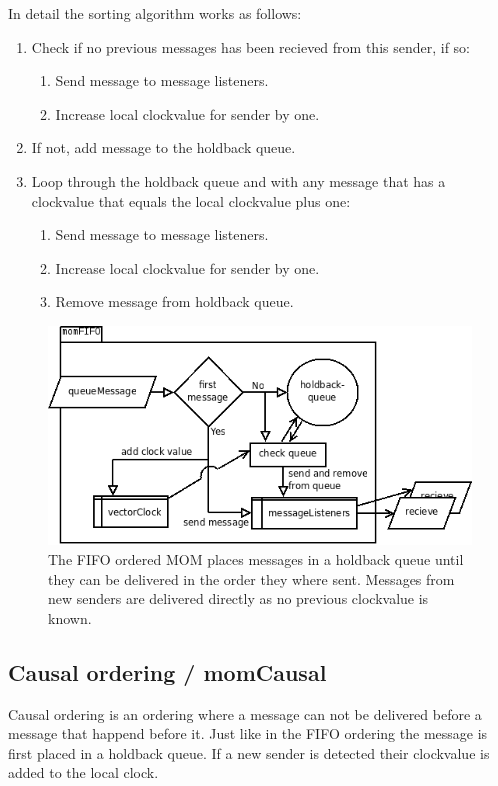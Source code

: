 \documentclass[english]{article}
\begin{document}
In detail the sorting algorithm works as follows:
\begin{enumerate}
\item Check if no previous messages has been recieved from this sender, if so:
	\begin{enumerate}
	\item Send message to message listeners.
	\item Increase local clockvalue for sender by one.
	\end{enumerate}
\item If not, add message to the holdback queue.
\item Loop through the holdback queue and with any message that has a clockvalue that equals the local clockvalue plus one:
	\begin{enumerate}
	\item Send message to message listeners.
	\item Increase local clockvalue for sender by one.
	\item Remove message from holdback queue.
	\end{enumerate}
\end{enumerate}

\begin{figure}
\includegraphics[width=\textwidth]{momFIFO.png}
\caption{The FIFO ordered MOM places messages in a holdback queue until they can be delivered in the order they where sent. Messages from new senders are delivered directly as no previous clockvalue is known.}
\label{fig:fifo}
\end{figure}

\subsection{Causal ordering / momCausal}
Causal ordering is an ordering where a message can not be delivered before a message that happend before it. Just like in the FIFO ordering the message is first placed in a holdback queue. If a new sender is detected their clockvalue is added to the local clock.
\end{document}
